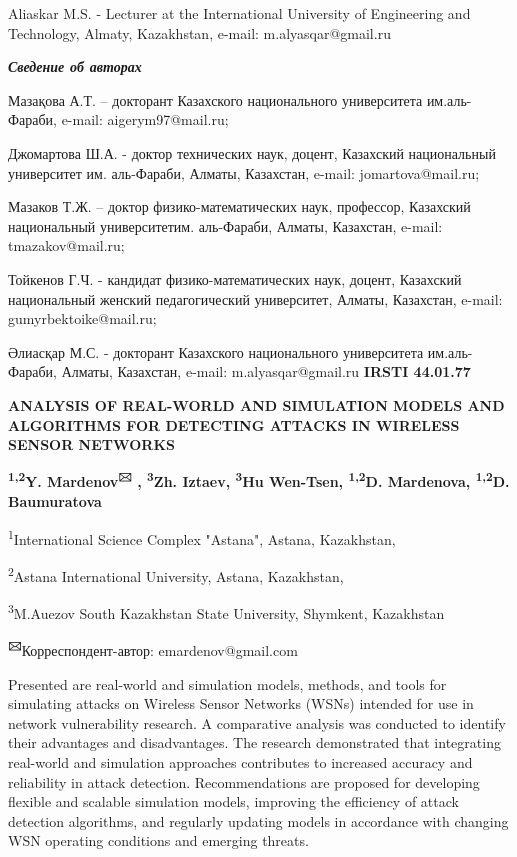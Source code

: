 Aliaskar M.S. - Lecturer at the International University of Engineering
and Technology, Almaty, Kazakhstan, e-mail: m.alyasqar@gmail.ru

\emph{{\bfseries Сведение об авторах}}

Мазақова А.Т. -- докторант Казахского национального университета
им.аль-Фараби, e-mail: aigerym97@mail.ru;

Джомартова Ш.А. - доктор технических наук, доцент, Казахский
национальный университет им. аль-Фараби, Алматы, Казахстан, e-mail:
jomartova@mail.ru;

Мазаков Т.Ж. -- доктор физико-математических наук, профессор, Казахский
национальный университетим. аль-Фараби, Алматы, Казахстан, e-mail:
tmazakov@mail.ru;

Тойкенов Г.Ч. - кандидат физико-математических наук, доцент, Казахский
национальный женский педагогический университет, Алматы, Казахстан,
e-mail: gumyrbektoike@mail.ru;

Әлиасқар М.С. - докторант Казахского национального университета
им.аль-Фараби, Алматы, Казахстан, e-mail: m.alyasqar@gmail.ru\newpage
{\bfseries IRSTI 44.01.77}

{\bfseries ANALYSIS OF REAL-WORLD AND SIMULATION MODELS AND ALGORITHMS FOR
DETECTING ATTACKS IN WIRELESS SENSOR NETWORKS}

{\bfseries \textsuperscript{1,2}Y. Mardenov\textsuperscript{🖂} ,
\textsuperscript{3}Zh. Iztaev, \textsuperscript{3}Hu Wen-Tsen,
\textsuperscript{1,2}D. Mardenova, \textsuperscript{1,2}D. Baumuratova}

\textsuperscript{1}International Science Complex "Astana", Astana,
Kazakhstan,

\textsuperscript{2}Astana International University, Astana, Kazakhstan,

\textsuperscript{3}M.Auezov South Kazakhstan State University, Shymkent,
Kazakhstan

{\bfseries \textsuperscript{🖂}}Корреспондент-автор: emardenov@gmail.com

Presented are real-world and simulation models, methods, and tools for
simulating attacks on Wireless Sensor Networks (WSNs) intended for use
in network vulnerability research. A comparative analysis was conducted
to identify their advantages and disadvantages. The research
demonstrated that integrating real-world and simulation approaches
contributes to increased accuracy and reliability in attack detection.
Recommendations are proposed for developing flexible and scalable
simulation models, improving the efficiency of attack detection
algorithms, and regularly updating models in accordance with changing
WSN operating conditions and emerging threats.

